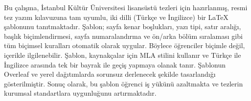 Bu çalışma, İstanbul Kültür Üniversitesi lisansüstü tezleri için hazırlanmış,
resmi tez yazım kılavuzuna tam uyumlu, iki dilli (Türkçe ve İngilizce) bir
LaTeX şablonunu tanıtmaktadır.
Şablon; sayfa kenar boşlukları, yazı tipi, satır aralığı, başlık biçimlendirmesi,
sayfa numaralandırma ve ön/arka bölüm sıralaması gibi tüm biçimsel kuralları
otomatik olarak uygular.
Böylece öğrenciler biçimle değil, içerikle ilgilenebilir.
Şablon, kaynakçalar için MLA stilini kullanır ve Türkçe ile İngilizce arasında
tek bir bayrak ile geçiş yapmaya olanak tanır.
Şablonun Overleaf ve yerel dağıtımlarda sorunsuz derlenecek şekilde
tasarlandığı gösterilmiştir.
Sonuç olarak, bu şablon öğrenci iş yükünü azaltmakta ve tezlerin kurumsal
standartlara uygunluğunu artırmaktadır.

